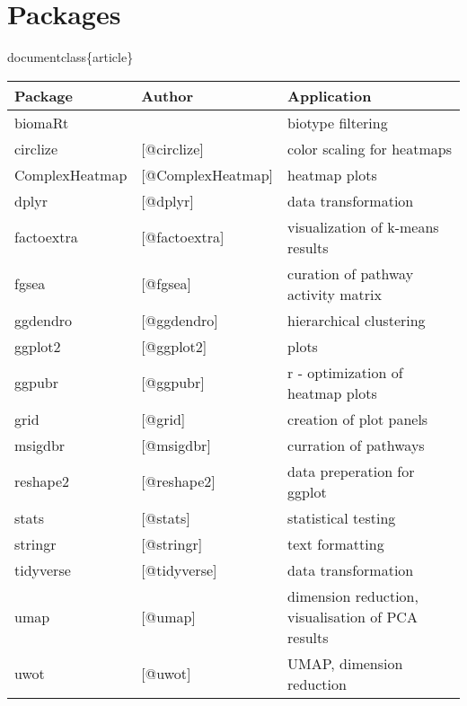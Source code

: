 \documentclass[
  parskip,
  oneside]{scrreprt}
\begin{document}
\hypertarget{packages-1}{%
\section{Packages}\label{packages-1}}

documentclass\{article\}

\begin{table}[!ht]
    \centering
    \begin{tabular}{|l|l|l|}
    \hline
        Package & Author & Application \\ \hline
        biomaRt &{\cite{@BioMart}}& biotype filtering  \\ \hline
        circlize & [@circlize] & color scaling for heatmaps  \\ \hline
        ComplexHeatmap & [@ComplexHeatmap] & heatmap plots  \\ \hline
        dplyr & [@dplyr] & data transformation  \\ \hline
        factoextra & [@factoextra] & visualization of k-means results  \\ \hline
        fgsea & [@fgsea] & curation of pathway activity matrix  \\ \hline
        ggdendro & [@ggdendro] & hierarchical clustering  \\ \hline
        ggplot2 & [@ggplot2] & plots  \\ \hline
        ggpubr & [@ggpubr] & r - optimization of heatmap plots  \\ \hline
        grid & [@grid] & creation of plot panels  \\ \hline
        msigdbr & [@msigdbr] & curration of pathways  \\ \hline
        reshape2 & [@reshape2] & data preperation for ggplot  \\ \hline
        stats & [@stats] & statistical testing  \\ \hline
        stringr & [@stringr] & text formatting  \\ \hline
        tidyverse & [@tidyverse] & data transformation  \\ \hline
        umap & [@umap] & dimension reduction, visualisation of PCA results  \\ \hline
        uwot & [@uwot] & UMAP, dimension reduction  \\ \hline
    \end{tabular}
\end{table}
\end{document}
